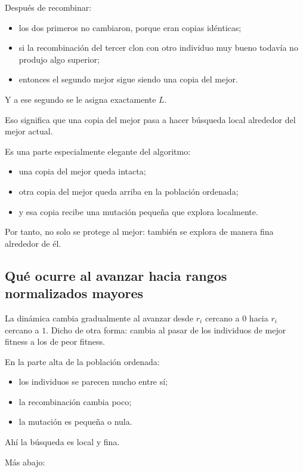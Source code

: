 \documentclass[11pt]{article}
\begin{document}
Despu\'es de recombinar:

\begin{itemize}
  \item los dos primeros no cambiaron, porque eran copias id\'enticas;
  \item si la recombinaci\'on del tercer clon con otro individuo muy bueno
  todav\'ia no produjo algo superior;
  \item entonces el segundo mejor sigue siendo una copia del mejor.
\end{itemize}

Y a ese segundo se le asigna exactamente \(L\).

Eso significa que una copia del mejor pasa a hacer b\'usqueda local alrededor
del mejor actual.

Es una parte especialmente elegante del algoritmo:

\begin{itemize}
  \item una copia del mejor queda intacta;
  \item otra copia del mejor queda arriba en la poblaci\'on ordenada;
  \item y esa copia recibe una mutaci\'on peque\~na que explora localmente.
\end{itemize}

Por tanto, no solo se protege al mejor: tambi\'en se explora de manera fina
alrededor de \'el.

\subsection{Qu\'e ocurre al avanzar hacia rangos normalizados mayores}

La din\'amica cambia gradualmente al avanzar desde \(r_i\) cercano a \(0\)
hacia \(r_i\) cercano a \(1\). Dicho de otra forma: cambia al pasar de los
individuos de mejor fitness a los de peor fitness.

En la parte alta de la poblaci\'on ordenada:

\begin{itemize}
  \item los individuos se parecen mucho entre s\'i;
  \item la recombinaci\'on cambia poco;
  \item la mutaci\'on es peque\~na o nula.
\end{itemize}

Ah\'i la b\'usqueda es local y fina.

M\'as abajo:
\end{document}
